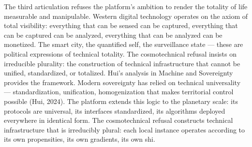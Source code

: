 The third articulation refuses the platform’s ambition to render the totality of life measurable and manipulable. Western digital technology operates on the axiom of total visibility: everything that can be sensed can be captured, everything that can be captured can be analyzed, everything that can be analyzed can be monetized. The smart city, the quantified self, the surveillance state — these are political expressions of technical totality. The cosmotechnical refusal insists on irreducible plurality: the construction of technical infrastructure that cannot be unified, standardized, or totalized. Hui’s analysis in Machine and Sovereignty provides the framework. Modern sovereignty has relied on technical universality — standardization, unification, homogenization that makes territorial control possible (Hui, 2024). The platform extends this logic to the planetary scale: its protocols are universal, its interfaces standardized, its algorithms deployed everywhere in identical form. The cosmotechnical refusal constructs technical infrastructure that is irreducibly plural: each local instance operates according to its own propensities, its own gradients, its own shi.

